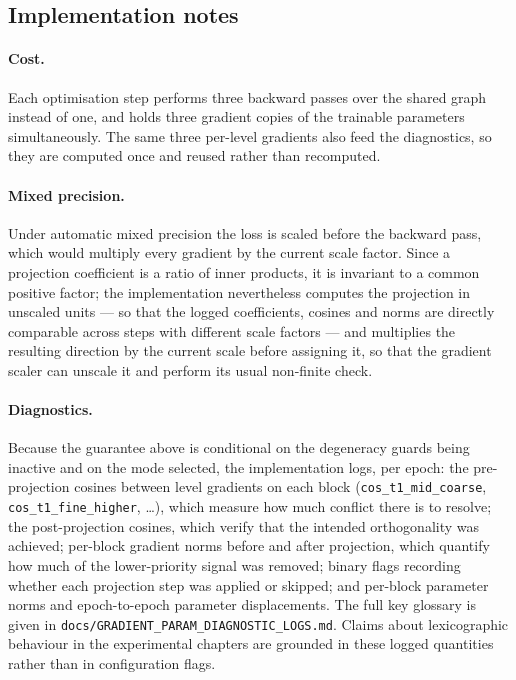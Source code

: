 \subsection{Implementation notes}
\label{ssec:lex_implementation}

\paragraph{Cost.} Each optimisation step performs three backward passes over the shared graph
instead of one, and holds three gradient copies of the trainable parameters simultaneously. The
same three per-level gradients also feed the diagnostics, so they are computed once and reused
rather than recomputed.

\paragraph{Mixed precision.} Under automatic mixed precision the loss is scaled before the
backward pass, which would multiply every gradient by the current scale factor. Since a
projection coefficient is a ratio of inner products, it is invariant to a common positive factor;
the implementation nevertheless computes the projection in unscaled units --- so that the logged
coefficients, cosines and norms are directly comparable across steps with different scale factors
--- and multiplies the resulting direction by the current scale before assigning it, so that the
gradient scaler can unscale it and perform its usual non-finite check.

\paragraph{Diagnostics.} Because the guarantee above is conditional on the degeneracy guards
being inactive and on the mode selected, the implementation logs, per epoch: the pre-projection
cosines between level gradients on each block (\texttt{cos\_t1\_mid\_coarse},
\texttt{cos\_t1\_fine\_higher}, \dots), which measure how much conflict there is to resolve; the
post-projection cosines, which verify that the intended orthogonality was achieved; per-block
gradient norms before and after projection, which quantify how much of the lower-priority signal
was removed; binary flags recording whether each projection step was applied or skipped; and
per-block parameter norms and epoch-to-epoch parameter displacements. The full key glossary is
given in \texttt{docs/GRADIENT\_PARAM\_DIAGNOSTIC\_LOGS.md}. Claims about lexicographic behaviour
in the experimental chapters are grounded in these logged quantities rather than in configuration
flags.

